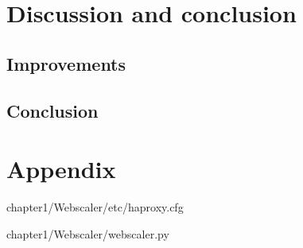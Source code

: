 \section{Discussion and conclusion}
\subsection{Improvements}

\subsection{Conclusion}

\section{Appendix}

{chapter1/Webscaler/etc/haproxy.cfg}

\thispagestyle{empty}
\begin{center}

{chapter1/Webscaler/webscaler.py}
\end{center}
\restoregeometry
